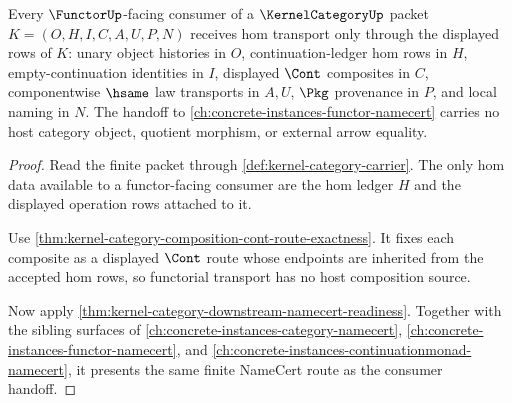 \begin{theorem}
\label{thm:kernel-category-functor-continuation-handoff}
Every $\FunctorUp$-facing consumer of a $\KernelCategoryUp$ packet $K=(O,H,I,C,A,U,P,N)$ receives hom transport only through the displayed rows of $K$: unary object histories in $O$, continuation-ledger hom rows in $H$, empty-continuation identities in $I$, displayed $\Cont$ composites in $C$, componentwise $\hsame$ law transports in $A,U$, $\Pkg$ provenance in $P$, and local naming in $N$. The handoff to \autoref{ch:concrete-instances-functor-namecert} carries no host category object, quotient morphism, or external arrow equality.
\end{theorem}
\begin{proof}
Read the finite packet through \autoref{def:kernel-category-carrier}. The only hom data available to a functor-facing consumer are the hom ledger $H$ and the displayed operation rows attached to it.

Use \autoref{thm:kernel-category-composition-cont-route-exactness}. It fixes each composite as a displayed $\Cont$ route whose endpoints are inherited from the accepted hom rows, so functorial transport has no host composition source.

Now apply \autoref{thm:kernel-category-downstream-namecert-readiness}. Together with the sibling surfaces of \autoref{ch:concrete-instances-category-namecert}, \autoref{ch:concrete-instances-functor-namecert}, and \autoref{ch:concrete-instances-continuationmonad-namecert}, it presents the same finite NameCert route as the consumer handoff.
\end{proof}

